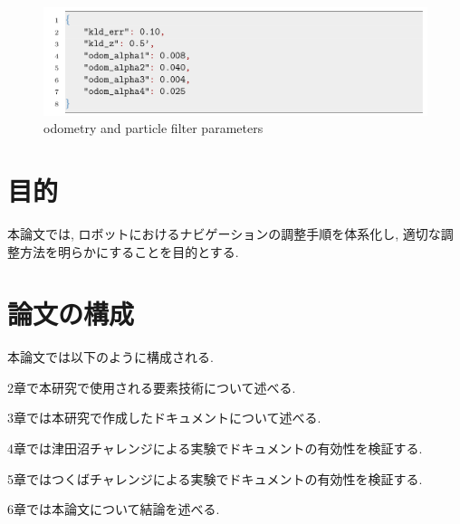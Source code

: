 \begin{figure}[hbtp]
  \centering
 \includegraphics[keepaspectratio, scale=0.3]
      {images/senkou_2.png}
 \caption{odometry and particle filter parameters}
 \label{Fig:odometry and particle filter parameters}
\end{figure}
\newpage
\section{目的}
本論文では, ロボットにおけるナビゲーションの調整手順を体系化し, 適切な調整方法を明らかにすることを目的とする. 

\section{論文の構成}
本論文では以下のように構成される. 

2章で本研究で使用される要素技術について述べる. 

3章では本研究で作成したドキュメントについて述べる. 

4章では津田沼チャレンジによる実験でドキュメントの有効性を検証する. 

5章ではつくばチャレンジによる実験でドキュメントの有効性を検証する. 

6章では本論文について結論を述べる. 

\newpage
